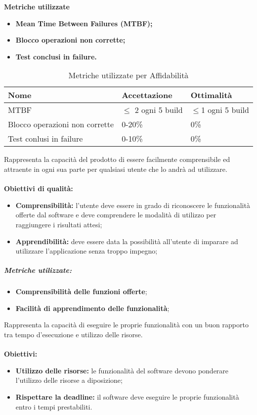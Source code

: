 \textbf{Metriche utilizzate}
\begin{itemize}
	\item \textbf{Mean Time Between Failures (MTBF)\pedice;}
	\item \textbf{Blocco operazioni non corrette;}
	\item \textbf{Test conclusi in failure.}
\end{itemize}
\begin{table}[!htpb]
	\centering
	\renewcommand{\arraystretch}{2} 
	\begin{tabular}{|l|l|l|}
		\rowcolor{orange!50}
		\hline
		\textbf{Nome} &  \textbf{Accettazione} & \textbf{Ottimalità} \\ \hline
		MTBF     & $\leq$ 2 ogni 5 build & $\leq$1 ogni 5 build          \\ \hline
		Blocco operazioni non corrette   &    0-20\% &  0\%       \\ \hline
		Test conlusi in failure          &     0-10\%          &      0\%        \\ \hline
	\end{tabular}
	\caption{Metriche utilizzate per Affidabilità}
\end{table}
Rappresenta la capacità del prodotto di essere facilmente comprensibile ed attraente in ogni sua parte per qualsiasi utente che lo andrà ad utilizzare.\\\\
\textbf{Obiettivi di qualità:}
\begin{itemize}
    \item \textbf{Comprensibilità:} l’utente deve essere in grado di riconoscere le funzionalità offerte dal software e deve comprendere le modalità di utilizzo per raggiungere i risultati attesi;
    \item \textbf{Apprendibilità:} deve essere data la possibilità all'utente di imparare ad utilizzare l’applicazione senza troppo impegno;
\end{itemize}
\subparagraph{Metriche utilizzate:}
\begin{itemize}
    \item \textbf{Comprensibilità delle funzioni offerte};
    \item \textbf{Facilità di apprendimento delle funzionalità};
\end{itemize}

Rappresenta la capacità di eseguire le proprie funzionalità con un buon rapporto tra tempo d'esecuzione e utilizzo delle risorse.\\\\
\textbf{Obiettivi:}
\begin{itemize}
	\item \textbf{Utilizzo delle risorse:} le funzionalità del software devono ponderare l'utilizzo delle risorse a diposizione;
	\item \textbf{Rispettare la deadline:} il software deve eseguire le proprie funzionalità entro i tempi prestabiliti.
\end{itemize}

